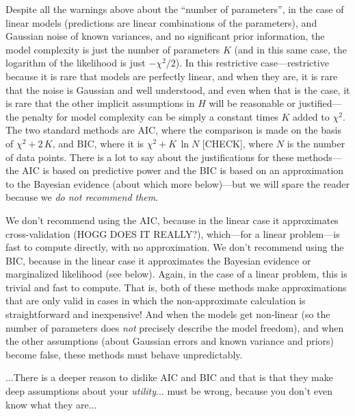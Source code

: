 \documentclass[12pt,twoside]{article}
\begin{document}
Despite all the warnings above about the ``number of parameters'', in
the case of linear models (predictions are linear combinations of the
parameters), and Gaussian noise of known variances, and no significant
prior information, the model complexity is just the number of
parameters $K$ (and in this same case, the logarithm of the likelihood
is just $-\chi^2/2$).  In this restrictive case---restrictive because
it is rare that models are perfectly linear, and when they are, it is
rare that the noise is Gaussian and well understood, and even when
that is the case, it is rare that the other implicit assumptions in
$H$ will be reasonable or justified---the penalty for model complexity
can be simply a constant times $K$ added to $\chi^2$.  The two
standard methods are AIC, where the comparison is made on the basis of $\chi^2 +
2\,K$, and BIC, where it is $\chi^2 + K\,\ln N$ [CHECK], where $N$ is
the number of data points.  There is a lot to say about the
justifications for these methods---the AIC is based on predictive
power and the BIC is based on an approximation to the Bayesian
evidence (about which more below)---but we will spare the reader
because we \emph{do not recommend them}.

We don't recommend using the AIC, because in the linear case it
approximates cross-validation (HOGG DOES IT REALLY?), which---for a
linear problem---is fast to compute directly, with no approximation.
We don't recommend using the BIC, because in the linear case it
approximates the Bayesian evidence or marginalized likelihood (see
below).  Again, in the case of a linear problem, this is trivial and
fast to compute.  That is, both of these methods make approximations
that are only valid in cases in which the non-approximate calculation
is straightforward and inexpensive!  And when the models get
non-linear (so the number of parameters does \emph{not} precisely
describe the model freedom), and when the other assumptions (about
Gaussian errors and known variance and priors) become false, these
methods must behave unpredictably.



...There is a deeper reason to dislike AIC and BIC and that is that
they make deep assumptions about your \emph{utility}... must be wrong,
because you don't even know what they are...
\end{document}
